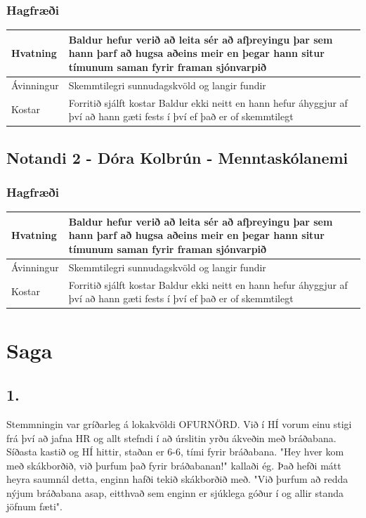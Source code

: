 \documentclass{article}
\begin{document}
\subsubsection*{Hagfræði}
\begin{center}  
        \begin{tabular}{|p{2cm}|p{9cm}|}
        \hline
        Hvatning&Baldur hefur verið að leita sér að afþreyingu þar sem hann þarf að hugsa aðeins meir en þegar hann situr tímunum saman fyrir framan sjónvarpið\\
        \hline
        Ávinningur&Skemmtilegri sunnudagskvöld og langir fundir\\
        \hline
        Kostar&Forritið sjálft kostar Baldur ekki neitt en hann hefur áhyggjur af því að hann gæti fests í því ef það er of skemmtilegt\\
        \hline
    \end{tabular}
\end{center}

\subsection*{Notandi 2 - Dóra Kolbrún - Menntaskólanemi}
\subsubsection*{Hagfræði}
\begin{center}  
    \begin{tabular}{|p{2cm}|p{9cm}|}
    \hline
    Hvatning&Baldur hefur verið að leita sér að afþreyingu þar sem hann þarf að hugsa aðeins meir en þegar hann situr tímunum saman fyrir framan sjónvarpið\\
    \hline
    Ávinningur&Skemmtilegri sunnudagskvöld og langir fundir\\
    \hline
    Kostar&Forritið sjálft kostar Baldur ekki neitt en hann hefur áhyggjur af því að hann gæti fests í því ef það er of skemmtilegt\\
    \hline
\end{tabular}
\end{center}

\section*{Saga}
\subsection*{1.}
Stemmningin var gríðarleg á lokakvöldi OFURNÖRD. 
Við í HÍ vorum einu stigi frá því að jafna HR og allt stefndi í að úrslitin yrðu ákveðin með bráðabana.
Síðasta kastið og HÍ hittir, staðan er 6-6, tími fyrir bráðabana. 
"Hey hver kom með skákborðið, við þurfum það fyrir bráðabanan!" kallaði ég.
Það hefði mátt heyra saumnál detta, enginn hafði tekið skákborðið með.
"Við þurfum að redda nýjum bráðabana asap, eitthvað sem enginn er sjúklega góður í og allir standa jöfnum fæti".
\end{document}
